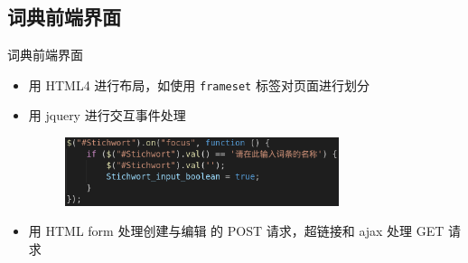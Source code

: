 \documentclass[notheorems,xetex]{beamer}
\begin{document}
\subsection{词典前端界面}
\begin{frame}{词典前端界面}
\begin{itemize}
	\item 用 HTML4 进行布局，如使用 \texttt{frameset} 标签对页面进行划分
	\item 用 jquery 进行交互事件处理
	\begin{figure}
		\includegraphics[height=2cm]{jquery.png}
	\end{figure}
	\item 用 HTML form 处理创建与编辑 的 POST 请求，超链接和 ajax 处理 GET 请求
\end{itemize}
\begin{figure}
\end{figure}

\end{frame}
\end{document}
